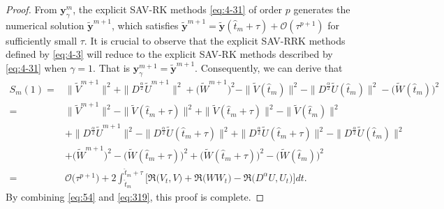 \documentclass[preprint,compress,3p,10pt,fleqn]{elsarticle}
\numberwithin{equation}{section}
\newtheorem{lemma}[theorem]{Lemma}
\begin{document}
\begin{proof}
From $\bm{y}_\gamma^m$, the explicit SAV-RK methods \eqref{eq:4-31} of order $p$ generates the numerical solution  $\tilde{\bm{y}}^{m+1}$, which satisfies $\tilde{\bm{y}}^{m+1}=\tilde{\bm{y}}\left(\hat{t}_m+\tau\right)+\mathcal{O}\left(\tau^{p+1}\right)$ for sufficiently small $\tau$. It is crucial to observe that the explicit SAV-RRK methods defined by \eqref{eq:4-3} will reduce to the explicit SAV-RK methods described by \eqref{eq:4-31} when $\gamma=1$. That is $\bm{y}_\gamma^{m +1}=\tilde{\bm{y}}^{m +1}$. Consequently, we can derive that
\begin{align}
S_m(1) = &\|\tilde{V}^{m+1}\|^2 + \|D^\frac{\alpha}{2} \tilde{U}^{m+1}\|^2+\big(\tilde{W}^{m+1}\big)^2-\|\tilde{V}(\hat{t}_{m})\|^2 - \|D^\frac{\alpha}{2} \tilde{U}(\hat{t}_{m})\|^2-\big(\tilde{W}(\hat{t}_{m})\big)^2 \nonumber\\
= &\|\tilde{V}^{m+1}\|^2 -\|\tilde{V}(\hat{t}_{m}+\tau)\|^2 +\|\tilde{V}(\hat{t}_{m}+\tau)\|^2-\|\tilde{V}(\hat{t}_{m})\|^2\nonumber\\
& + \|D^\frac{\alpha}{2} \tilde{U}^{m+1}\|^2 -\|D^\frac{\alpha}{2} \tilde{U}(\hat{t}_{m}+\tau)\|^2+\|D^\frac{\alpha}{2} \tilde{U}(\hat{t}_{m}+\tau)\|^2- \|D^\frac{\alpha}{2} \tilde{U}(\hat{t}_{m})\|^2\nonumber\\
& +\big(\tilde{W}^{m+1}\big)^2 -\big(\tilde{W}(\hat{t}_{m}+\tau)\big)^2+\big(\tilde{W}(\hat{t}_{m}+\tau)\big)^2-\big(\tilde{W}(\hat{t}_{m})\big)^2 \nonumber\\
= &\mathcal{O}\big(\tau^{p+1}\big) +2\int_{\hat{t}_m}^{\hat{t}_m+\tau}\big[\Re\big(V_t, V\big) + \Re\big(W W_t\big) - \Re\big(D^{\alpha} U, U_t\big)\big]dt.\label{eq:54}
\end{align}
By combining \eqref{eq:54} and \eqref{eq:319}, this proof is complete.
\end{proof}
	
\end{document}
